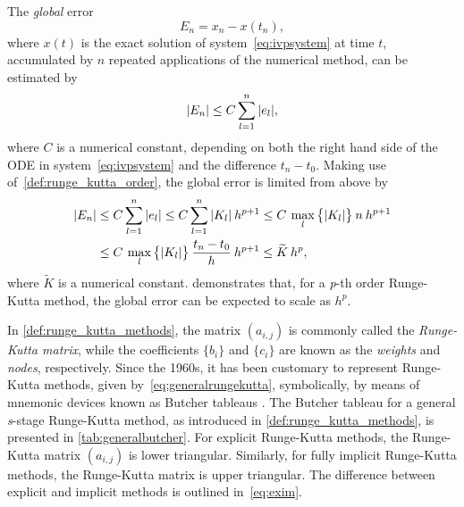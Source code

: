 The \emph{global} error
\begin{equation}
    \label{eq:globalrungekuttaerror}
    E_{n} = x_{n}-x(t_{n}),
\end{equation}
where $x(t)$ is the exact solution of system~\eqref{eq:ivpsystem} at time $t$,
accumulated by $n$ repeated applications of the numerical method, can be
estimated by
\begin{equation}
    \label{eq:globalrungekuttaerrorapprox}
    \abs{E_{n}} \leq C\sum\limits_{l=1}^{n}\abs{e_{l}},
\end{equation}
where $C$ is a numerical constant, depending on both the right hand side of the
ODE in system~\eqref{eq:ivpsystem} and the difference $t_{n}-t_{0}$. Making
use of~\cref{def:runge_kutta_order}, the global error is limited from above by
\begin{equation}
    \label{eq:globalrungekuttaerrorestimate}
    \begin{aligned}
        \abs{E_{n}} &\leq C\sum\limits_{l=1}^{n}\abs{e_{l}} %
        \leq C\sum\limits_{l=1}^{n}\abs{K_{l}}\hspace{0.5ex}h^{p+1}%
        \leq C\hspace{0.5ex}\max\limits_{l}\big\{\abs{K_{l}}\big\}\hspace{0.5ex}n\hspace{0.5ex}h^{p+1}\\
        &\leq C\hspace{0.5ex}\max\limits_{l}\big\{\abs{K_{l}}\big\}\hspace{0.5ex}\frac{t_{n}-t_{0}}{h}\hspace{0.5ex}h^{p+1}
        \leq \widetilde{K}\hspace{0.5ex}h^{p},
    \end{aligned}
\end{equation}
where $\widetilde{K}$ is a numerical constant.
 demonstrates that, for a \emph{p}-th
order Runge-Kutta method, the global error can be expected to scale as $h^{p}$.

In \cref{def:runge_kutta_methods}, the matrix $(a_{i,j})$ is commonly called
the \emph{Runge-Kutta matrix}, while the coefficients $\{b_{i}\}$ and
$\{c_{i}\}$ are known as the \emph{weights} and \emph{nodes}, respectively.
Since the 1960s, it has been customary to represent Runge-Kutta methods, given
by~\cref{eq:generalrungekutta}, symbolically, by means of mnemonic devices known
as Butcher tableaus \parencite[p.134]{hairer1993solving}. The Butcher tableau
for a general \emph{s}-stage Runge-Kutta method, as introduced in
\cref{def:runge_kutta_methods}, is presented in \cref{tab:generalbutcher}.
For explicit Runge-Kutta methods, the Runge-Kutta matrix $(a_{i,j})$ is lower
triangular. Similarly, for fully implicit Runge-Kutta methods, the Runge-Kutta
matrix is upper triangular. The difference between explicit and implicit
methods is outlined in~\cref{eq:exim}.

